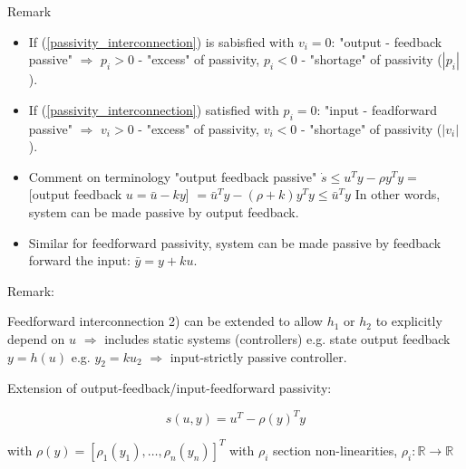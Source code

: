 Remark
\begin{itemize}
 \item If (\ref{passivity_interconnection}) is sabisfied with $v_i=0$: "output - feedback passive" $\Rightarrow$ $p_i>0$
  -  "excess" of passivity, $p_i<0$ - "shortage" of passivity ($|p_i|$).
 \item If (\ref{passivity_interconnection}) satisfied with $p_i=0$: "input - feadforward passive" $\Rightarrow$ $v_i>0$
  -  "excess" of passivity, $v_i<0$ - "shortage" of passivity ($|v_i|$).
 \item Comment on terminology "output feedback passive" 
  $\dot s \le u^Ty-\rho y^Ty =$ [output feedback $u=\bar u -ky$] 
  $=\bar u^T y - (\rho+k)y^T y \le \bar u^Ty$ In other words, system can be made passive
  by output feedback.
 \item Similar for feedforward passivity, system can be made passive by feedback forward
  the input: $\bar y = y + ku$.
\end{itemize}

Remark:

Feedforward interconnection 2) can be extended to allow $h_1$ or $h_2$ to explicitly depend
on $u$ $\Rightarrow$ includes static systems (controllers) e.g. state output feedback $y=h(u)$
e.g. $y_2=ku_2$ $\Rightarrow$ input-strictly passive controller.

Extension of output-feedback/input-feedforward passivity:

$$s(u,y)=u^T-\rho(y)^Ty$$

with $\rho(y) = [\rho_1(y_1),\dots,\rho_n(y_n)]^T$ with $\rho_i$ section non-linearities, 
$\rho_i: \mathbb{R}\rightarrow\mathbb{R}$

